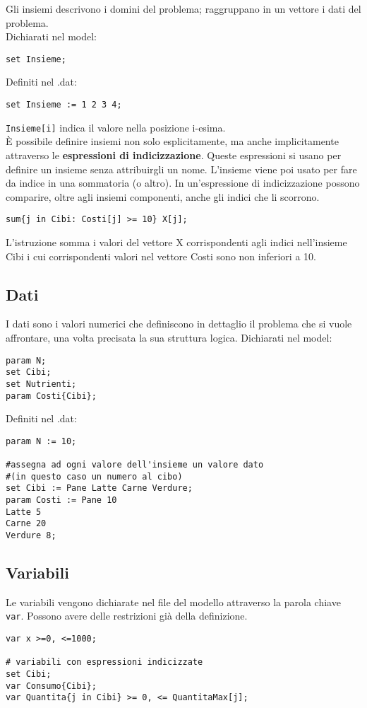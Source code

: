 Gli insiemi descrivono i domini del problema; raggruppano in un vettore i dati del problema. \\
Dichiarati nel model:
\begin{verbatim}
set Insieme;
\end{verbatim}
Definiti nel .dat:
\begin{verbatim}
set Insieme := 1 2 3 4;
\end{verbatim}
\texttt{Insieme[i]} indica il valore nella posizione i-esima. \\

È possibile definire insiemi non solo esplicitamente, ma anche implicitamente attraverso le \textbf{espressioni di indicizzazione}. Queste espressioni si usano per definire un insieme senza attribuirgli un nome. L'insieme viene poi usato per fare da indice in una sommatoria (o altro). In un'espressione di indicizzazione possono comparire, oltre agli insiemi componenti, anche gli indici che li scorrono.
\begin{verbatim}
sum{j in Cibi: Costi[j] >= 10} X[j];
\end{verbatim}
L'istruzione somma i valori del vettore X corrispondenti agli indici nell'insieme Cibi i cui corrispondenti valori nel vettore Costi sono non inferiori a 10.

\subsection{Dati}
I dati sono i valori numerici che definiscono in dettaglio il problema che si vuole affrontare, una volta precisata la sua struttura logica. 
Dichiarati nel model:
\begin{verbatim}
param N;
set Cibi;
set Nutrienti;
param Costi{Cibi};
\end{verbatim}
Definiti nel .dat:
\begin{verbatim}
param N := 10;

#assegna ad ogni valore dell'insieme un valore dato
#(in questo caso un numero al cibo)
set Cibi := Pane Latte Carne Verdure;
param Costi := Pane 10
Latte 5
Carne 20
Verdure 8;
\end{verbatim}

\subsection{Variabili}

Le variabili vengono dichiarate nel file del modello attraverso la parola chiave \texttt{var}. Possono avere delle restrizioni già della definizione.
\begin{verbatim}
var x >=0, <=1000; 

# variabili con espressioni indicizzate
set Cibi;
var Consumo{Cibi};
var Quantita{j in Cibi} >= 0, <= QuantitaMax[j];
\end{verbatim}

